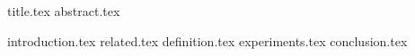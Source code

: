 \documentclass[11pt]{llncs}
\begin{document}
{title.tex}
\thispagestyle{plain}
{abstract.tex}

{introduction.tex}
{related.tex}
{definition.tex}
{experiments.tex}
{conclusion.tex}



\end{document}
